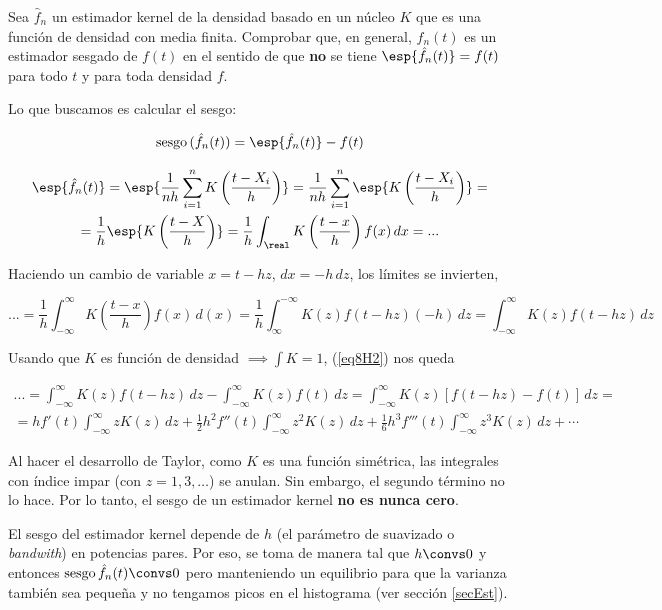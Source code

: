 \begin{problem}[8] Sea $\hat{f}_n$ un estimador kernel de la densidad basado en un núcleo $K$ que es una función de densidad con media finita. Comprobar que, en general, $\hat{f}_n(t)$ es un estimador sesgado de $f(t)$ en el sentido de que \textbf{no} se tiene $\esp{\hat{f}_n(t)} = f(t)$ para todo $t$ y para toda densidad $f$.

\solution

Lo que buscamos es calcular el sesgo:

\begin{equation} \label{eq8H2}
\text{sesgo}\,(\hat{f}_n(t)) = \esp{\hat{f}_n(t)} - f(t)
\end{equation}

\begin{gather*}
\esp{\hat{f}_n(t)} =
\esp{\frac{1}{nh}\sum_{i=1}^n K \left(\frac{t-X_i}{h}\right)} =
\frac{1}{nh}\sum_{i=1}^n \esp{K\left(\frac{t-X_i}{h}\right)} =\\
= \frac{1}{h} \esp{K\left(\frac{t-X}{h}\right)} =
\frac{1}{h} \int_\real K \left(\frac{t-x}{h}\right) f(x) \,dx = ...
\end{gather*}

Haciendo un cambio de variable $x = t-hz$, $dx = -h\,dz$, los límites se invierten,

\[
... = \frac{1}{h} \int_{-\infty}^\infty K \left(\frac{t-x}{h}\right) f(x) \,d(x) =
\frac{1}{h} \int_\infty^{-\infty} K(z) f(t-hz) (- h) \,dz =
\int_{-\infty}^\infty K(z) f(t-hz)\,dz
\]

Usando que $K$ es función de densidad $\implies \int K = 1$, (\ref{eq8H2}) nos queda

\begin{gather*}
... = \int_{-\infty}^\infty K(z) f(t-hz)\,dz - \int_{-\infty}^\infty K(z) f(t)\, dz =
\int_{-\infty}^\infty K(z) \left[f(t-hz)-f(t)\right]\,dz =\\
= hf'(t)\int_{-\infty}^\infty zK(z)\,dz + \frac{1}{2} h^2 f''(t) \int_{-\infty}^\infty z^2K(z)\,dz + \frac{1}{6}h^3 f'''(t) \int_{-\infty}^\infty z^3K(z)\,dz + \dotsb  
\end{gather*}

Al hacer el desarrollo de Taylor, como $K$ es una función simétrica, las integrales con índice impar (con $z=1, 3,\dotsc$) se anulan. Sin embargo, el segundo término no lo hace. Por lo tanto, el sesgo de un estimador kernel \textbf{no es nunca cero}. 

El sesgo del estimador kernel depende de $h$ (el parámetro de suavizado o \textit{bandwith}) en potencias pares. Por eso, se toma de manera tal que $h\convs 0$ y entonces $\text{sesgo}\,\hat{f}_n(t) \convs 0$ pero manteniendo un equilibrio para que la varianza también sea pequeña y no tengamos picos en el histograma (ver sección \ref{secEst}).

\end{problem}

